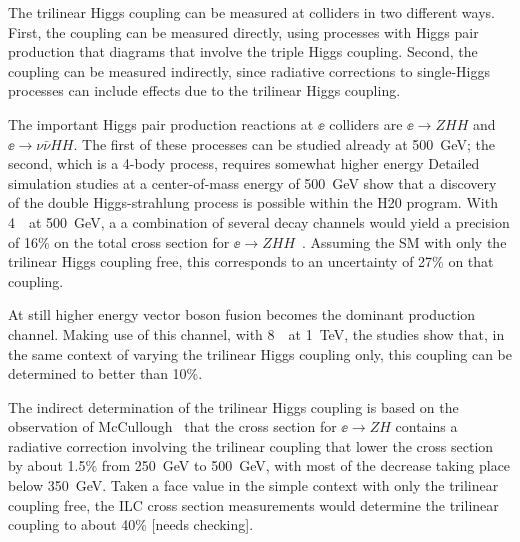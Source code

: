 


The  trilinear Higgs coupling can be measured at colliders in two
different ways.   First, the coupling can be measured directly, using 
processes with Higgs pair production
that  diagrams that involve the triple Higgs coupling.  Second, the
coupling can be measured indirectly, since
radiative corrections to single-Higgs processes can include effects
due to the trilinear Higgs coupling.

The important Higgs pair production reactions at $\ee$ colliders are 
$\ee\to ZHH$ and $\ee\to \nu\bar\nu HH$.    The first of these
processes can be studied already at 500~GeV; the second, which is a
4-body process, requires
somewhat higher energy
Detailed simulation studies at a center-of-mass energy of 500~GeV show that a discovery of the
double Higgs-strahlung process is possible within the H20 program.
With 4~\iab\ at 500~GeV, a
a combination of several decay channels
would yield a precision of 16\% on the total cross section for
$\ee\to ZHH$~\cite{Duerig:2016dvi}.   Assuming the SM with only the
trilinear Higgs coupling free, this corresponds to an uncertainty of
27\% on that coupling.

At still higher energy vector boson fusion becomes the dominant
production channel. Making use of this channel, with  8~\iab\ at
1~TeV, the studies \cite{TianHHH,Roloff:2019crr} show that, in the
same context of varying the trilinear Higgs coupling only, this
coupling can be determined to better than 10\%. 



The indirect determination of the trilinear Higgs coupling is based on
the observation of McCullough~\cite{McCullough:2013rea} that the cross
section for $\ee\to ZH$ contains a radiative correction involving the
trilinear coupling that lower the cross section by about 1.5\% from
250~GeV to 500~GeV, with most of the decrease taking place below
350~GeV.  Taken a face value in the simple context with only the
trilinear coupling free, the ILC cross section measurements would determine the trilinear 
coupling to about 40\% [needs checking].

